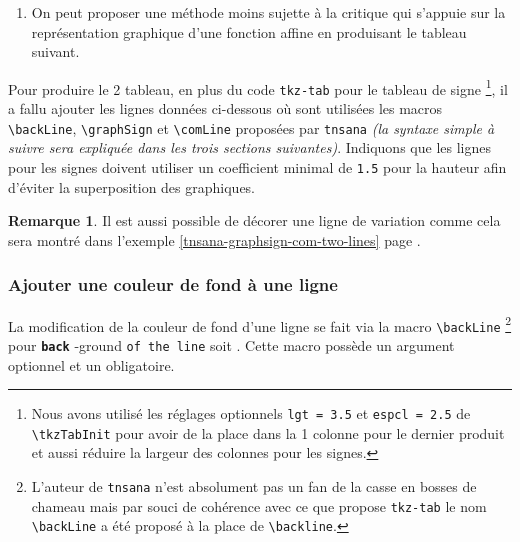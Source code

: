 \documentclass[12pt,a4paper]{book}
\makeatletter
\newcommand\env[1]{\texttt{#1}}
\newcommand\macro[1]{\env{\textbackslash{}#1}}
\theoremstyle{definition}
\newtheorem*{remark}{Remarque}
\newcommand\whyprefix[2]{%
	\textbf{\prefix{#1}}-#2%
}
\newcommand\prefix[1]{%
	\texttt{#1}%
}
\newcommand\inenglish{\@ifstar{\@inenglish@star}{\@inenglish@no@star}}
\newcommand\@inenglish@star[1]{%
	\emph{\og #1 \fg}%
}
\newcommand\@inenglish@no@star[1]{%
	\@inenglish@star{#1} en anglais%
}
\makeatother
\begin{document}
{{\begin{enumerate}
    \item On peut proposer une méthode moins sujette à la critique qui s'appuie sur la représentation graphique d'une fonction affine en produisant le tableau suivant.
\end{enumerate}

\begin{center}
	
\end{center}


Pour produire le 2\ieme{} tableau, en plus du code \verb#tkz-tab# pour le tableau de signe
\footnote{
	Nous avons utilisé les réglages optionnels
	\texttt{lgt = 3.5} et \texttt{espcl = 2.5} de \macro{tkzTabInit}
	pour avoir de la place dans la 1\iere{} colonne pour le dernier produit
	et aussi réduire la largeur des colonnes pour les signes.
},
il a fallu ajouter les lignes données ci-dessous où sont utilisées les macros     \macro{backLine}, \macro{graphSign} et \macro{comLine} proposées par \verb+tnsana+ \emph{(la syntaxe simple à suivre sera expliquée dans les trois sections suivantes)}.
	Indiquons que les lignes pour les signes doivent utiliser un coefficient minimal de \texttt{1.5} pour la hauteur afin d'éviter la superposition des graphiques.

\medskip



\begin{remark}
	Il est aussi possible de décorer une ligne de variation comme cela sera montré dans l'exemple \ref{tnsana-graphsign-com-two-lines} page \pageref{tnsana-graphsign-com-two-lines}. 
\end{remark}




\subsubsection{Ajouter une couleur de fond à une ligne}

La modification de la couleur de fond d'une ligne se fait via la macro \macro{backLine}
\footnote{
    L'auteur de \prefix{tnsana} n'est absolument pas un fan de la casse en bosses de chameau mais par souci de cohérence avec ce que propose \prefix{tkz-tab} le nom \macro{backLine} a été proposé à la place de \macro{backline}.
}
pour \whyprefix{back}{ground} \prefix{of the line} soit \inenglish{fond de la ligne}.
Cette macro possède un argument optionnel et un obligatoire.

}}
\end{document}
